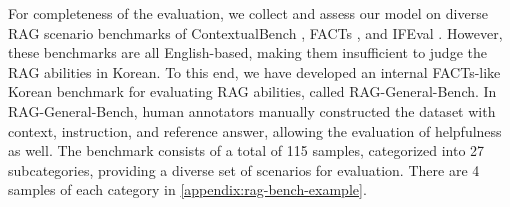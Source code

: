 For completeness of the evaluation, we collect and assess our model on diverse RAG scenario benchmarks of ContextualBench \citep{nguyen2024sfrragcontextuallyfaithfulllms}, FACTs \citep{jacovi2025factsgroundingleaderboardbenchmarking}, and IFEval \citep{zhou2023instructionfollowingevaluationlargelanguage}.
However, these benchmarks are all English-based, making them insufficient to judge the RAG abilities in Korean.
To this end, we have developed an internal FACTs-like Korean benchmark for evaluating RAG abilities, called RAG-General-Bench.
In RAG-General-Bench, human annotators manually constructed the dataset with context, instruction, and reference answer, allowing the evaluation of helpfulness as well. 
The benchmark consists of a total of 115 samples, categorized into 27 subcategories, providing a diverse set of scenarios for evaluation. There are 4 samples of each category in \autoref{appendix:rag-bench-example}.


